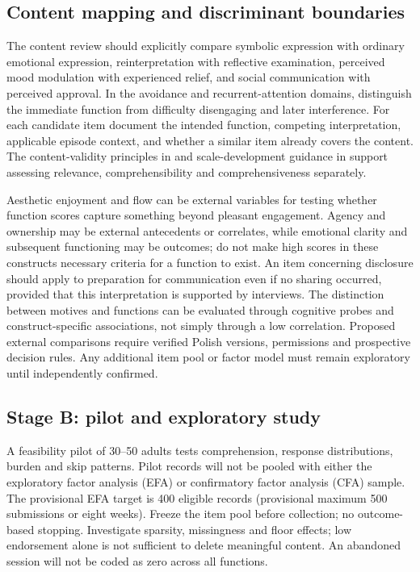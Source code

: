 \subsection{Content mapping and discriminant boundaries}
The content review should explicitly compare symbolic expression with ordinary emotional expression, reinterpretation with reflective examination, perceived mood modulation with experienced relief, and social communication with perceived approval. In the avoidance and recurrent-attention domains, distinguish the immediate function from difficulty disengaging and later interference. For each candidate item document the intended function, competing interpretation, applicable episode context, and whether a similar item already covers the content. The content-validity principles in \textcite{terwee2018} and scale-development guidance in \textcite{boateng2018} support assessing relevance, comprehensibility and comprehensiveness separately.

Aesthetic enjoyment and flow can be external variables for testing whether function scores capture something beyond pleasant engagement. Agency and ownership may be external antecedents or correlates, while emotional clarity and subsequent functioning may be outcomes; do not make high scores in these constructs necessary criteria for a function to exist. An item concerning disclosure should apply to preparation for communication even if no sharing occurred, provided that this interpretation is supported by interviews. The distinction between motives and functions can be evaluated through cognitive probes and construct-specific associations, not simply through a low correlation. Proposed external comparisons require verified Polish versions, permissions and prospective decision rules. Any additional item pool or factor model must remain exploratory until independently confirmed.

\subsection{Stage B: pilot and exploratory study}
A feasibility pilot of 30--50 adults tests comprehension, response distributions, burden and skip patterns. Pilot records will not be pooled with either the exploratory factor analysis (EFA) or confirmatory factor analysis (CFA) sample. The provisional EFA target is 400 eligible records (provisional maximum 500 submissions or eight weeks). Freeze the item pool before collection; no outcome-based stopping. Investigate sparsity, missingness and floor effects; low endorsement alone is not sufficient to delete meaningful content. An abandoned session will not be coded as zero across all functions.

